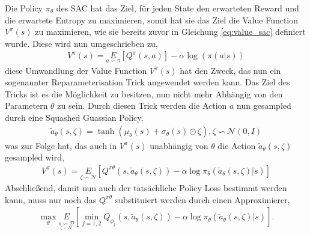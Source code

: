 \documentclass[]{iat}
\begin{document}
Die Policy $\pi_{\theta}$ des SAC hat das Ziel, für jeden State den erwarteten Reward und die erwartete Entropy zu maximieren, somit hat sie das Ziel die Value Function $V^{\pi}(s)$ zu maximieren, wie sie bereits zuvor in Gleichung \ref{eq:value_sac} definiert wurde. Diese wird nun umgeschrieben zu,
\begin{align}
    V^{\pi}(s) = \underset{a \backsim \pi}{E} \left[Q^{\pi}(s, a)\right] - \alpha \log(\pi(a | s)) \label{eq:value_sac2}
\end{align}
diese Umwandlung der Value Function $V^{\pi}(s)$ hat den Zweck, das nun ein sogenannter Reparameterisation Trick angewendet werden kann. Das Ziel des Tricks ist es die Möglichkeit zu besitzen, nun nicht mehr Abhängig von den Parametern $\theta$ zu sein. Durch diesen Trick werden die Action $a$ nun gesampled durch eine Squashed Guassian Policy,
\begin{align}
    \widetilde{a}_\theta(s, \zeta) = \tanh(\mu_\theta(s) + \sigma_\theta(s) \odot \zeta), \zeta \backsim \mathcal{N} (0, I) \label{eq:reparamtrick}
\end{align}
was zur Folge hat, das auch in $V^{\pi}(s)$ unabhängig von $\theta$ die Action $\widetilde{a}_\theta(s, \zeta)$ gesampled wird,
\begin{align}
    V^{\pi}(s) = \underset{\zeta \backsim \mathcal{N} }{E} \left[Q^{\pi\theta}(s, \widetilde{a}_\theta(s, \zeta)) - \alpha \log\pi_\theta(\widetilde{a}_\theta(s, \zeta) | s)\right]
\end{align}
Abschließend, damit nun auch der tatsächliche Policy Loss bestimmt werden kann, muss nur noch das $Q^{\pi\theta}$ substituiert werden durch einen Approximierer,
\begin{align}
    \max_\theta \underset{\underset{\zeta \backsim \mathcal{N} }{s \backsim \mathcal{D} }}{E} \left[\min_{j=1,2}Q_{\phi_j}(s,\widetilde{a}_\theta(s, \zeta)) - \alpha \log \pi_\theta(\widetilde{a}_\theta(s, \zeta)|s)\right].
\end{align}
\cite[]{sacv2} \cite[]{brockman2016openai}
\end{document}
